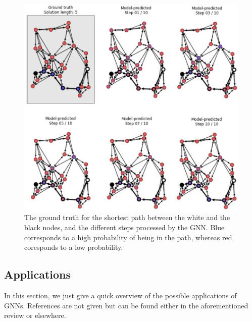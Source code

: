 \documentclass{article}
\begin{document}
\begin{figure}
    \centering
    \includegraphics[scale=.6]{images/shortest_path_resolution.jpg}
    \caption{The ground truth for the shortest path between the white and the black nodes, and the different steps processed by the GNN. Blue corresponds to a high probability of being in the path, whereas red coresponds to a low probability.}
    \label{fig:shortest-path-resolution}
\end{figure}

    \subsection{Applications}
    \label{subsec:applications}

In this section, we just give a quick overview of the possible applications of GNNs. References are not given but can be found either in the aforementioned review \cite{wu2019comprehensive} or elsewhere.
\end{document}
